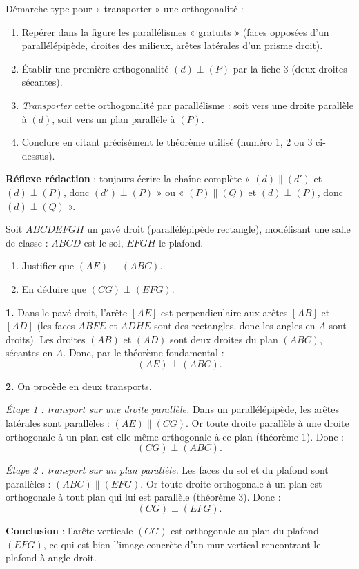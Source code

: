 \documentclass[11pt]{article}
\begin{document}
\begin{methode}
Démarche type pour « transporter » une orthogonalité :
\begin{enumerate}
\item Repérer dans la figure les parallélismes « gratuits » (faces opposées d'un parallélépipède, droites des milieux, arêtes latérales d'un prisme droit).
\item Établir une première orthogonalité $(d) \perp (P)$ par la fiche 3 (deux droites sécantes).
\item \emph{Transporter} cette orthogonalité par parallélisme : soit vers une droite parallèle à $(d)$, soit vers un plan parallèle à $(P)$.
\item Conclure en citant précisément le théorème utilisé (numéro 1, 2 ou 3 ci-dessus).
\end{enumerate}
\textbf{Réflexe rédaction} : toujours écrire la chaîne complète « $(d) \parallel (d')$ et $(d) \perp (P)$, donc $(d') \perp (P)$ » ou « $(P) \parallel (Q)$ et $(d) \perp (P)$, donc $(d) \perp (Q)$ ».
\end{methode}

\begin{exoresolu}
Soit $ABCDEFGH$ un pavé droit (parallélépipède rectangle), modélisant une salle de classe : $ABCD$ est le sol, $EFGH$ le plafond.
\begin{enumerate}
\item Justifier que $(AE) \perp (ABC)$.
\item En déduire que $(CG) \perp (EFG)$.
\end{enumerate}
\tcblower
\textbf{1.} Dans le pavé droit, l'arête $[AE]$ est perpendiculaire aux arêtes $[AB]$ et $[AD]$ (les faces $ABFE$ et $ADHE$ sont des rectangles, donc les angles en $A$ sont droits). Les droites $(AB)$ et $(AD)$ sont deux droites du plan $(ABC)$, sécantes en $A$. Donc, par le théorème fondamental :
\[ (AE) \perp (ABC). \]

\medskip
\textbf{2.} On procède en deux transports.

\emph{Étape 1 : transport sur une droite parallèle.} Dans un parallélépipède, les arêtes latérales sont parallèles : $(AE) \parallel (CG)$. Or toute droite parallèle à une droite orthogonale à un plan est elle-même orthogonale à ce plan (théorème 1). Donc :
\[ (CG) \perp (ABC). \]

\emph{Étape 2 : transport sur un plan parallèle.} Les faces du sol et du plafond sont parallèles : $(ABC) \parallel (EFG)$. Or toute droite orthogonale à un plan est orthogonale à tout plan qui lui est parallèle (théorème 3). Donc :
\[ (CG) \perp (EFG). \]

\textbf{Conclusion} : l'arête verticale $(CG)$ est orthogonale au plan du plafond $(EFG)$, ce qui est bien l'image concrète d'un mur vertical rencontrant le plafond à angle droit.
\end{exoresolu}
\end{document}
